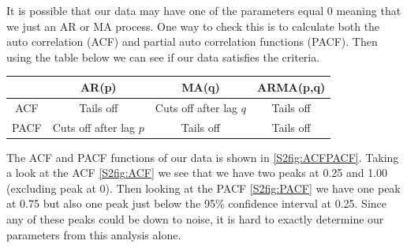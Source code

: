 It is possible that our data may have one of the parameters equal 0 meaning that we just an AR or MA process. One way to check this is to calculate both the auto correlation (ACF) and partial auto correlation functions (PACF). Then using the table below we can see if our data satisfies the criteria.
\par\medskip
\begin{center}
    \begin{tabular}{c|c|c|c}
        & AR(p) & MA(q) & ARMA(p,q) \\
        \hline ACF & Tails off & Cuts off after lag $q$ & Tails off \\
        PACF & Cuts off after lag $p$ & Tails off & Tails off \\
    \end{tabular}
\end{center}
\par\medskip
The ACF and PACF functions of our data is shown in \autoref{S2fig:ACFPACF}. Taking a look at the ACF \autoref{S2fig:ACF} we see that we have two peaks at 0.25 and 1.00 (excluding peak at 0). Then looking at the PACF \autoref{S2fig:PACF} we have one peak at 0.75 but also one peak just below the 95\% confidence interval at 0.25. Since any of these peaks could be down to noise, it is hard to exactly determine our parameters from this analysis alone.

